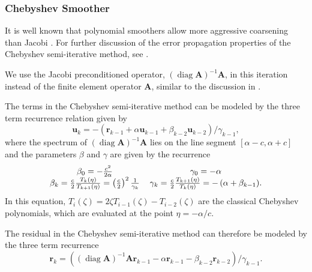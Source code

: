 \documentclass[review]{siamart190516}
\DeclareMathOperator{\diag}{diag}
\begin{document}
\subsubsection{Chebyshev Smoother}\label{sec:chebyshev}

It is well known that polynomial smoothers allow more aggressive coarsening than Jacobi \cite{brannick2015polynomial}.
For further discussion of the error propagation properties of the Chebyshev semi-iterative method, see \cite{gutknecht2002revisited}.

We use the Jacobi preconditioned operator, $\left( \diag {\mathbf{A}} \right)^{-1} {\mathbf{A}}$, in this iteration instead of the finite element operator ${\mathbf{A}}$, similar to the discussion in \cite{adams2003parallel}.

The terms in the Chebyshev semi-iterative method can be modeled by the three term recurrence relation given by
\begin{equation}
\mathbf{u}_k = - \left( \mathbf{r}_{k - 1} + \alpha \mathbf{u}_{k - 1} + \beta_{k - 2} \mathbf{u}_{k - 2} \right) / \gamma_{k - 1},
\label{eq:chebyshev_recursive}
\end{equation}
where the spectrum of $\left( \diag {\mathbf{A}} \right)^{-1} {\mathbf{A}}$ lies on the line segment $\left[ \alpha - c, \alpha + c \right]$ and the parameters $\beta$ and $\gamma$ are given by the recurrence
\begin{equation}
\begin{tabular}{c c}
$\beta_0 = - \frac{c^2}{2 \alpha}$ & $\gamma_0 = - \alpha$\\
$\beta_k = \frac{c}{2} \frac{T_k \left( \eta \right)}{T_{k + 1} \left( \eta \right)} = \left( \frac{c}{2} \right)^2 \frac{1}{\gamma_k}$ & $\gamma_k = \frac{c}{2} \frac{T_{k + 1} \left( \eta \right)}{T_k \left( \eta \right)} = - \left( \alpha + \beta_{k - 1} \right)$.
\end{tabular}
\end{equation}
In this equation, $T_i \left( \zeta \right) = 2 \zeta T_{i - 1} \left( \zeta \right) - T_{i - 2} \left( \zeta \right)$ are the classical Chebyshev polynomials, which are evaluated at the point $\eta = - \alpha / c$.

The residual in the Chebyshev semi-iterative method can therefore be modeled by the three term recurrence
\begin{equation}
\mathbf{r}_k = \left( \left( \diag {\mathbf{A}} \right)^{-1} {\mathbf{A}} \mathbf{r}_{k - 1} - \alpha \mathbf{r}_{k - 1} - \beta_{k - 2} \mathbf{r}_{k - 2} \right) / \gamma_{k - 1}.
\label{eq:chebyshev_error_recursive}
\end{equation}
\end{document}
